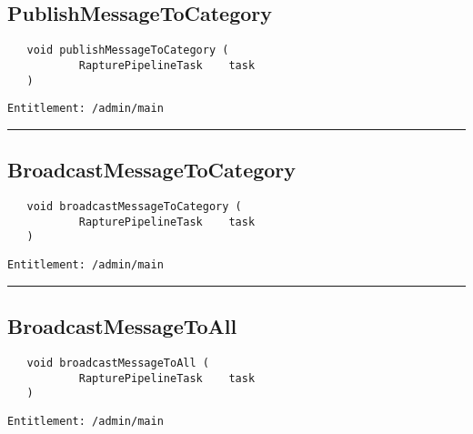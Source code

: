 \subsection{PublishMessageToCategory}
\label{Api:PublishMessageToCategory}
\begin{verbatim}
   void publishMessageToCategory (
           RapturePipelineTask    task
   )
\end{verbatim}
\begin{Verbatim}[fontsize=\small, formatcom=\color{Maroon}]
  Entitlement: /admin/main
\end{Verbatim}



\rule{12cm}{2pt}
\subsection{BroadcastMessageToCategory}
\label{Api:BroadcastMessageToCategory}
\begin{verbatim}
   void broadcastMessageToCategory (
           RapturePipelineTask    task
   )
\end{verbatim}
\begin{Verbatim}[fontsize=\small, formatcom=\color{Maroon}]
  Entitlement: /admin/main
\end{Verbatim}



\rule{12cm}{2pt}
\subsection{BroadcastMessageToAll}
\label{Api:BroadcastMessageToAll}
\begin{verbatim}
   void broadcastMessageToAll (
           RapturePipelineTask    task
   )
\end{verbatim}
\begin{Verbatim}[fontsize=\small, formatcom=\color{Maroon}]
  Entitlement: /admin/main
\end{Verbatim}



